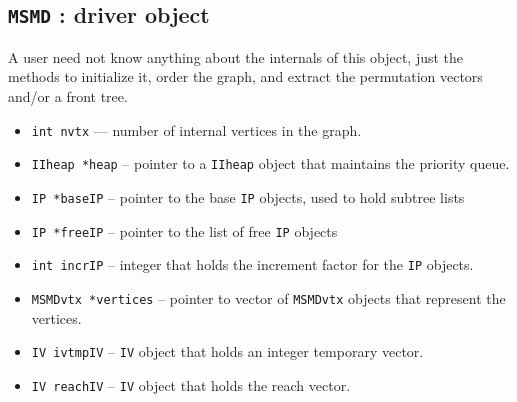\subsection{{\tt MSMD} : driver object}
\par
A user need not know anything about the internals of this object,
just the methods to initialize it, order the graph, and extract the
permutation vectors and/or a front tree.
\par
\begin{itemize}
\item
{\tt int nvtx} --- number of internal vertices in the graph.
\item
{\tt IIheap *heap} -- 
pointer to a {\tt IIheap} object that maintains the priority queue.
\item
{\tt IP *baseIP} -- pointer to the base {\tt IP} objects, used to hold
subtree lists 
\item
{\tt IP *freeIP} -- pointer to the list of free {\tt IP} objects
\item
{\tt int incrIP} -- integer that holds the increment factor for the
{\tt IP} objects.
\item
{\tt MSMDvtx *vertices} -- pointer to vector of {\tt MSMDvtx}
objects that represent the vertices.
\item
{\tt IV ivtmpIV} -- {\tt IV} object that holds an integer temporary
vector.
\item
{\tt IV reachIV} -- {\tt IV} object that holds the reach vector.
\end{itemize}
\par
\par
